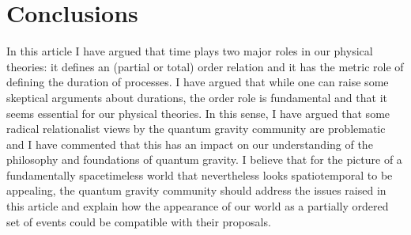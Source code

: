\documentclass[12 pt]{article}
\begin{document}
\section{Conclusions}

In this article I have argued that time plays two major roles in our physical theories: it defines an (partial or total) order relation and it has the metric role of defining the duration of processes. I have argued that while one can raise some skeptical arguments about durations, the order role is fundamental and that it seems essential for our physical theories. In this sense, I have argued that some radical relationalist views by the quantum gravity community are problematic and I have commented that this has an impact on our understanding of the philosophy and foundations of quantum gravity. I believe that for the picture of a fundamentally spacetimeless world that nevertheless looks spatiotemporal to be appealing, the quantum gravity community should address the issues raised in this article and explain how the appearance of our world as a partially ordered set of events could be compatible with their proposals.


%

\printbibliography



  
\end{document}
